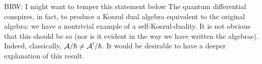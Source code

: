 \documentclass[11pt]{amsart}
\def\brian#1{{\textcolor{blue!65!red}{BRW: {#1}}}}
\begin{document}
\brian{I might want to temper this statement below}
The quantum differential conspires, in fact, to produce a Koszul dual algebra equivalent to the original algebra: we have a nontrivial example of a self-Koszul-duality. It is not obvious that this should be so (nor is it evident in the way we have written the algebras). Indeed, classically, $\mathcal A/\hbar \neq \mathcal A^{!}/\hbar$. It would be desirable to have a deeper explanation of this result. 
%
%




\end{document}
